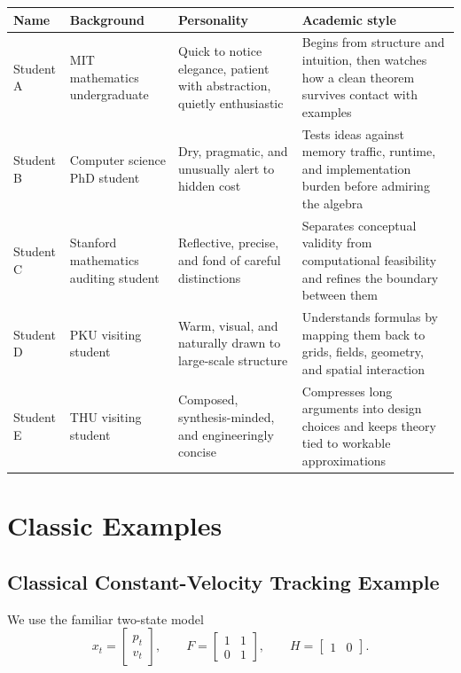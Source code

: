\documentclass[12pt,a4paper]{article}
\begin{document}
\begin{longtable}{>{\raggedright\arraybackslash}p{2.1cm} >{\raggedright\arraybackslash}p{4.2cm} >{\raggedright\arraybackslash}p{3.2cm} >{\raggedright\arraybackslash}p{4.1cm}}
\toprule
Name & Background & Personality & Academic style \\
\midrule
\endhead
Student A & MIT mathematics undergraduate & Quick to notice elegance, patient with abstraction, quietly enthusiastic & Begins from structure and intuition, then watches how a clean theorem survives contact with examples \\
Student B & Computer science PhD student & Dry, pragmatic, and unusually alert to hidden cost & Tests ideas against memory traffic, runtime, and implementation burden before admiring the algebra \\
Student C & Stanford mathematics auditing student & Reflective, precise, and fond of careful distinctions & Separates conceptual validity from computational feasibility and refines the boundary between them \\
Student D & PKU visiting student & Warm, visual, and naturally drawn to large-scale structure & Understands formulas by mapping them back to grids, fields, geometry, and spatial interaction \\
Student E & THU visiting student & Composed, synthesis-minded, and engineeringly concise & Compresses long arguments into design choices and keeps theory tied to workable approximations \\
\bottomrule
\end{longtable}

\section{Classic Examples}\label{app:classic-examples}

\subsection{Classical Constant-Velocity Tracking Example}\label{app:classic-1d}

We use the familiar two-state model
\[
x_t =
\begin{bmatrix}
p_t\\
v_t
\end{bmatrix},
\qquad
F =
\begin{bmatrix}
1 & 1\\
0 & 1
\end{bmatrix},
\qquad
H =
\begin{bmatrix}
1 & 0
\end{bmatrix}.
\]
\end{document}
